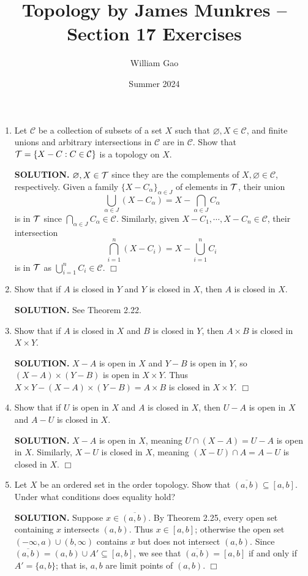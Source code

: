 \documentclass{article}
\title{Topology by James Munkres -- Section 17 Exercises}
\author{William Gao}
\date{Summer 2024}
\begin{document}
\maketitle
\begin{enumerate}
    \item Let $\mathcal{C}$ be a collection of subsets of a set $X$ such that $\varnothing, X \in \mathcal{C}$, and finite unions and arbitrary intersections in $\mathcal{C}$ are in $\mathcal{C}$. Show that $\mathcal{T} = \{X - C: C \in \mathcal{C}\}$ is a topology on $X$.

    {\bf SOLUTION.} $\varnothing, X \in \mathcal{T}$ since they are the complements of $X, \varnothing \in \mathcal{C}$, respectively. Given a family $\{X - C_\alpha\}_{\alpha \in J}$ of elements in $\mathcal{T}$, their union
    $$\bigcup_{\alpha \in J} (X - C_\alpha) = X - \bigcap_{\alpha \in J} C_\alpha$$
    is in $\mathcal{T}$ since $\bigcap_{\alpha \in J} C_\alpha \in \mathcal{C}$. Similarly, given $X-C_1, \cdots, X-C_n \in \mathcal{C}$, their intersection
    $$\bigcap_{i=1}^n (X-C_i) = X - \bigcup_{i=1}^n C_i$$
    is in $\mathcal{T}$ as $\bigcup_{i=1}^n C_i \in \mathcal{C}$. $\Box$

    \item Show that if $A$ is closed in $Y$ and $Y$ is closed in $X$, then $A$ is closed in $X$.

    {\bf SOLUTION.} See Theorem 2.22. 

    \item Show that if $A$ is closed in $X$ and $B$ is closed in $Y$, then $A \times B$ is closed in $X \times Y$. 

    {\bf SOLUTION.} $X-A$ is open in $X$ and $Y-B$ is open in $Y$, so $(X-A) \times (Y-B)$ is open in $X \times Y$. Thus $X \times Y - (X-A) \times (Y-B) = A \times B$ is closed in $X \times Y$. $\Box$

    \item Show that if $U$ is open in $X$ and $A$ is closed in $X$, then $U-A$ is open in $X$ and $A - U$ is closed in $X$. 

    {\bf SOLUTION.} $X-A$ is open in $X$, meaning $U \cap (X-A) = U - A$ is open in $X$. Similarly, $X-U$ is closed in $X$, meaning $(X-U) \cap A = A - U$ is closed in $X$. $\Box$

    \item Let $X$ be an ordered set in the order topology. Show that $\overline{(a, b)} \subseteq [a, b]$. Under what conditions does equality hold? 

    {\bf SOLUTION.} Suppose $x \in \overline{(a, b)}$. By Theorem 2.25, every open set containing $x$ intersects $(a, b)$. Thus $x \in [a,b]$; otherwise the open set $(-\infty, a) \cup (b, \infty)$ contains $x$ but does not intersect $(a, b)$. Since $\overline{(a, b)} = (a, b) \cup A' \subseteq [a, b]$, we see that $\overline{(a, b)} = [a, b]$ if and only if $A' = \{a, b\}$; that is, $a, b$ are limit points of $(a, b)$. $\Box$


\end{enumerate}
\end{document}
